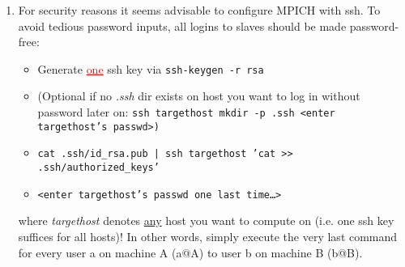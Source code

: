 \documentclass[a4paper,12pt]{article}
\newcommand{\dyeitred}{\textcolor{red}}{}
\begin{document}
\begin{enumerate}
\begin{enumerate}
\begin{enumerate}
\begin{center}
\begin{tabular}{l}
         \end{tabular}
         \end{center}
  \item For security reasons it seems advisable to configure \textsc{MPICH}
    with ssh. To avoid tedious password inputs, all logins to slaves should be
    made password-free:
    \begin{itemize}
      \item Generate \dyeitred{\underline{one}} ssh key via \texttt{ssh-keygen -r rsa}
        \item (Optional if no \textit{.ssh} dir exists on host you want to log
          in without password later on: \texttt{ssh targethost mkdir -p .ssh
            <enter targethost's passwd>)}
          \item \texttt{cat .ssh/id\_rsa.pub | ssh targethost 'cat >>
            .ssh/authorized\_keys'}
            \item \texttt{<enter targethost's passwd one last time\ldots>}
    \end{itemize}
    where \textit{targethost} denotes \underline{any} host you want to compute
    on (i.e. one ssh key suffices for all hosts)! In other words, simply execute the very last command for every user a on machine A (a@A) to user b on machine B (b@B).  
  

\end{enumerate}
\end{enumerate}
\end{enumerate}
\end{document}
